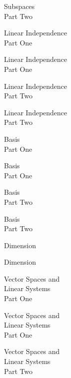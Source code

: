 \documentclass{titlescreen}
\begin{document}
% 
\begin{videotitle}
  Subspaces  \\[1ex]
  Part Two
\end{videotitle}
\begin{videoend}
  Linear Independence \\[1ex]
  Part One
\end{videoend}

\begin{videotitle}
  Linear Independence  \\[1ex]
  Part One
\end{videotitle}
\begin{videoend}
  Linear Independence \\[1ex]
  Part Two 
\end{videoend}

% 
\begin{videotitle}
  Linear Independence  \\[1ex]
  Part Two
\end{videotitle}
\begin{videoend}
  Basis \\[1ex]
  Part One
\end{videoend}


\begin{videotitle}
  Basis  \\[1ex]
  Part One
\end{videotitle}
\begin{videoend}
  Basis \\[1ex]
  Part Two 
\end{videoend}

% 
\begin{videotitle}
  Basis  \\[1ex]
  Part Two
\end{videotitle}
\begin{videoend}
  Dimension
\end{videoend}


\begin{videotitle}
  Dimension  
\end{videotitle}
\begin{videoend}
  Vector Spaces and \\[0.5ex]
  Linear Systems \\[1ex]
  Part One 
\end{videoend}

\begin{videotitle}
  Vector Spaces and \\[0.5ex]
  Linear Systems \\[1ex]
  Part One 
\end{videotitle}
\begin{videoend}
  Vector Spaces and \\[0.5ex]
  Linear Systems \\[1ex]
  Part Two
\end{videoend}
\end{document}
